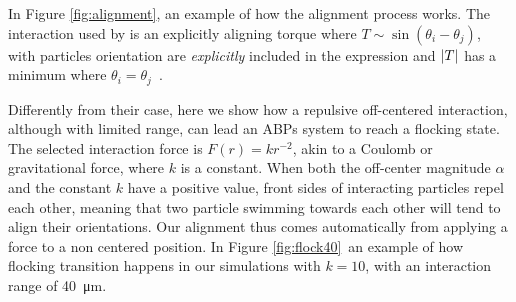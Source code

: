 \documentclass[../../master_thesis_np.tex]{subfiles}
\begin{document}
		In Figure \ref{fig:alignment}, an example of how the alignment process works. 
		The interaction used by \citeauthor{martin-gomez_collective_2018} is an explicitly aligning torque where $T \sim \sin( \theta_{i}-\theta_{j} )$, with particles orientation are \emph{explicitly} included in the expression and $\abs{T}$ has a minimum where $\theta_{i} = \theta_{j}$~\cite{martin-gomez_collective_2018}. 
		
		Differently from their case, here we show how a repulsive off-centered interaction, although with limited range, can lead an ABPs system to reach a flocking state. 
		The selected interaction force is $F(r) = kr^{-2}$, akin to a Coulomb or gravitational force, where $k$ is a constant. 
		When both the off-center magnitude $\alpha$ and the constant $k$ have a positive value, front sides of interacting particles repel each other, meaning that two particle swimming towards each other will tend to align their orientations. 
		Our alignment thus comes automatically from applying a force to a non centered position. 
		In Figure \ref{fig:flock40}\, an example of how flocking transition happens in our simulations with $k = 10$, with an interaction range of \SI{40}{\micro\meter}.
\end{document}
